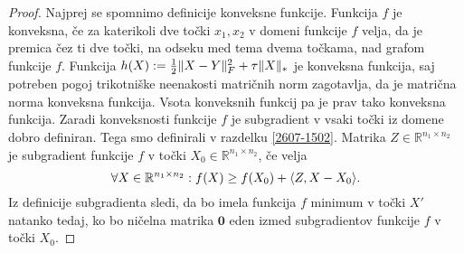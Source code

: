 \begin{proof} 
Najprej se spomnimo definicije konveksne funkcije. Funkcija $f$ je konveksna, če za katerikoli dve točki $x_1, x_2$ v domeni funkcije $f$ velja, da je premica čez ti dve točki, na odseku med tema dvema točkama, nad grafom funkcije $f$.
Funkcija $h(X) := \frac{1}{2} \lVert X-Y\rVert_F^2 + \tau\lVert X\rVert_* $ je konveksna funkcija, saj potreben pogoj trikotniške neenakosti matričnih norm zagotavlja, da je matrična norma konveksna funkcija. Vsota konveksnih funkcij pa je prav tako konveksna funkcija. 
Zaradi konveksnosti funkcije $f$ je 
subgradient v vsaki točki iz domene dobro definiran.
Tega smo definirali v razdelku \ref{2607-1502}.
Matrika $Z\in \mathbb R^{n_1\times n_2}$ je subgradient funkcije $f$ v točki 
$X_0\in \mathbb R^{n_1\times n_2}$,
če velja 
\[\forall X\in \mathbb R^{n_1\times n_2}: 
f(X) \geq  f(X_0) + \langle Z, X - X_0 \rangle.\]
Iz definicije subgradienta sledi, da bo imela funkcija $f$ minimum v točki $X'$ natanko tedaj,
ko bo ničelna matrika $\mathbf{0}$ eden izmed subgradientov funkcije $f$ v točki $X_0$.
\iffalse 
V minimumu funkcije $f$ bo eden od subgradientov iščemo minimum $X'$ funkcije $f$,  iščemo tako točko $X'$, da bo
\CG{eden izmed subgradientov po spremenljivki $X$} v točki $X'$ enak 0.  
\fi 


\end{proof}
